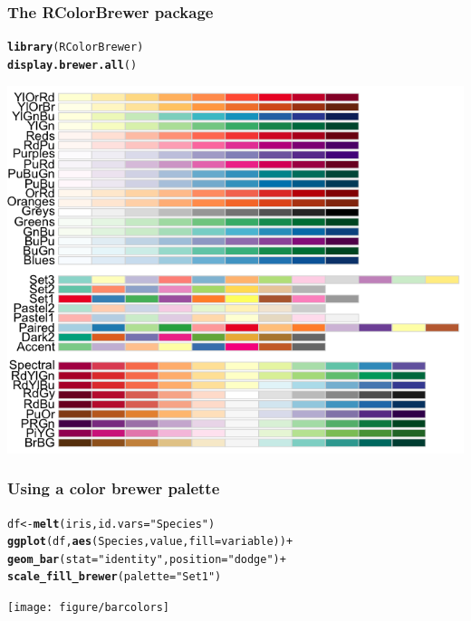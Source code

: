 \documentclass{beamer}\usepackage{graphicx, color}
\makeatletter
\newcommand{\hlfunctioncall}[1]{\textcolor[rgb]{0.501960784313725,0,0.329411764705882}{\textbf{#1}}}%
\newcommand{\hlstring}[1]{\textcolor[rgb]{0.6,0.6,1}{#1}}%
\newenvironment{kframe}{%
 \def\at@end@of@kframe{}%
 \ifinner\ifhmode%
  \def\at@end@of@kframe{\end{minipage}}%
  \begin{minipage}{\columnwidth}%
 \fi\fi%
 \def\FrameCommand##1{\hskip\@totalleftmargin \hskip-\fboxsep
 \colorbox{shadecolor}{##1}\hskip-\fboxsep
     \hskip-\linewidth \hskip-\@totalleftmargin \hskip\columnwidth}%
 \MakeFramed {\advance\hsize-\width
   \@totalleftmargin\z@ \linewidth\hsize
   \@setminipage}}%
 {\par\unskip\endMakeFramed%
 \at@end@of@kframe}
\newenvironment{knitrout}{}{} %
\makeatother
\begin{document}
\begin{frame}[fragile]
\frametitle{The RColorBrewer package}
\begin{knitrout}\footnotesize
{}\color{fgcolor}\begin{kframe}
\begin{alltt}
\hlfunctioncall{library}(RColorBrewer)
\hlfunctioncall{display.brewer.all}()
\end{alltt}
\end{kframe}
\end{knitrout}

\includegraphics[scale=0.25]{images/color_palette.png}
\end{frame}

\begin{frame}[fragile]
\frametitle{Using a color brewer palette}
\begin{knitrout}\footnotesize
{}\color{fgcolor}\begin{kframe}
\begin{alltt}
df  <- \hlfunctioncall{melt}(iris, id.vars = \hlstring{"Species"})
\hlfunctioncall{ggplot}(df, \hlfunctioncall{aes}(Species, value, fill = variable)) +
\hlfunctioncall{geom_bar}(stat = \hlstring{"identity"}, position = \hlstring{"dodge"}) +
\hlfunctioncall{scale_fill_brewer}(palette = \hlstring{"Set1"})
\end{alltt}
\end{kframe}
\texttt{[image: figure/barcolors]} 

\end{knitrout}

\end{frame}
\end{document}

